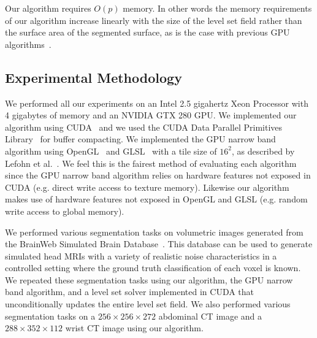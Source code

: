 \documentclass{egpubl}
\begin{document}
{{%

Our algorithm requires $O(p)$ memory. In other words the memory requirements of our algorithm increase linearly with the size of the level set field rather than the surface area of the segmented surface, as is the case with previous GPU algorithms~\cite{Lefohn-2003-MICCAI,Lefohn-2003-Vis,Cates-2004,Lefohn-2004,Jeong-2009}.

\subsection{Experimental Methodology}
\label{subsec:experimentalMethodology}


We performed all our experiments on an Intel 2.5 gigahertz Xeon Processor with 4 gigabytes of memory and an NVIDIA GTX 280 GPU. We implemented our algorithm using CUDA~\cite{NVIDIACUDA-2010} and we used the CUDA Data Parallel Primitives Library~\cite{CUDPP-2010} for buffer compacting. We implemented the GPU narrow band algorithm using OpenGL~\cite{Shreiner-2005} and GLSL~\cite{Rost-2006} with a tile size of $16^2$, as described by Lefohn et al.~\cite{Lefohn-2003-MICCAI,Lefohn-2003-Vis,Lefohn-2004}. We feel this is the fairest method of evaluating each algorithm since the GPU narrow band algorithm relies on hardware features not exposed in CUDA (e.g. direct write access to texture memory). Likewise our algorithm makes use of hardware features not exposed in OpenGL and GLSL (e.g. random write access to global memory).


We performed various segmentation tasks on volumetric images generated from the BrainWeb Simulated Brain Database~\cite{BrainWeb-2010,Kwan-1996,Cocosco-1997,Collins-1998,Kwan-1999}. This database can be used to generate simulated head MRIs with a variety of realistic noise characteristics in a controlled setting where the ground truth classification of each voxel is known. We repeated these segmentation tasks using our algorithm, the GPU narrow band algorithm, and a level set solver implemented in CUDA that unconditionally updates the entire level set field. We also performed various segmentation tasks on a $256 \times 256 \times 272$ abdominal CT image and a $288 \times 352 \times 112$ wrist CT image using our algorithm.

}}
\end{document}
